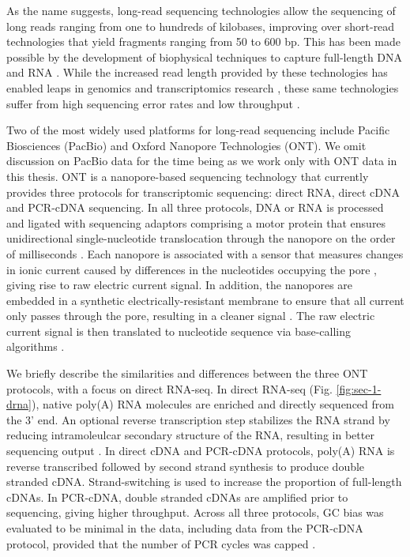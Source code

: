 As the name suggests, long-read sequencing technologies allow the sequencing of long reads ranging from one to hundreds of kilobases, improving over short-read technologies that yield fragments ranging from 50 to 600 bp. This has been made possible by the development of biophysical techniques to capture full-length DNA and RNA \cite{Weirather2017}. While the increased read length provided by these technologies has enabled leaps in genomics and transcriptomics research \cite{Bolisetty2015, Byrne2017, DeCoster2019, Liu2019, Mantere2019, Nurk2021}, these same technologies suffer from high sequencing error rates and low throughput \cite{Carneiro2012, Reuter2015, Jain2015}.  

Two of the most widely used platforms for long-read sequencing include Pacific Biosciences (PacBio) and Oxford Nanopore Technologies (ONT). We omit discussion on PacBio data for the time being as we work only with ONT data in this thesis. ONT is a nanopore-based sequencing technology that currently provides three protocols for transcriptomic sequencing: direct RNA, direct cDNA and PCR-cDNA sequencing. In all three protocols, DNA or RNA is processed and ligated with sequencing adaptors comprising a motor protein that ensures unidirectional single-nucleotide translocation through the nanopore on the order of milliseconds \cite{Jain2016}. Each nanopore is associated with a sensor that measures changes in ionic current caused by differences in the nucleotides occupying the pore \cite{Jain2016}, giving rise to raw electric current signal. In addition, the nanopores are embedded in a synthetic electrically-resistant membrane to ensure that all current only passes through the pore, resulting in a cleaner signal \cite{Wang2021}. The raw electric current signal is then translated to nucleotide sequence via base-calling algorithms \cite{Rang2018}. 

We briefly describe the similarities and differences between the three ONT protocols, with a focus on direct RNA-seq. In direct RNA-seq (Fig. \ref{fig:sec-1-drna}), native poly(A) RNA molecules are enriched and directly sequenced from the 3' end. An optional reverse transcription step stabilizes the RNA strand by reducing intramoleulcar secondary structure of the RNA, resulting in better sequencing output \cite{Garalde2018}. In direct cDNA and PCR-cDNA protocols, poly(A) RNA is reverse transcribed followed by second strand synthesis to produce double stranded cDNA. Strand-switching is used to increase the proportion of full-length cDNAs. In PCR-cDNA, double stranded cDNAs are amplified prior to sequencing, giving higher throughput. Across all three protocols, GC bias was evaluated to be minimal in the data, including data from the PCR-cDNA protocol, provided that the number of PCR cycles was capped \cite{ONT}. 

